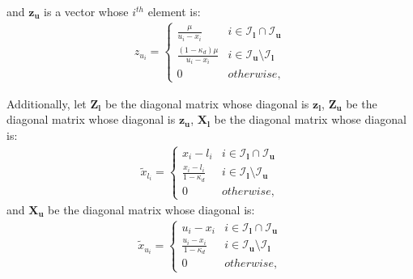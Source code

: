  and $\bm{z}_{\bm{u}}$ is a vector whose $i^{th}$ element is:
  \begin{align}
      z_{u_i} = \begin{cases}
        \frac{\mu}{u_i - x_i} & i \in \mathcal{I}_{\bm{l}} \cap \mathcal{I}_{\bm{u}} \\
        \frac{(1 - \kappa_d) \mu}{u_i - x_i} &  i \in \mathcal{I}_{\bm{u}} \setminus \mathcal{I}_{\bm{l}} \\
        0 & otherwise,
      \end{cases}
  \end{align}
  
  Additionally, let $\bm{Z}_{\bm{l}}$ be the diagonal matrix whose diagonal is $\bm{z}_{\bm{l}}$, $\bm{Z}_{\bm{u}}$ be the diagonal matrix whose diagonal is $\bm{z}_{\bm{u}}$, $\bm{X}_{\bm{l}}$ be the diagonal matrix whose diagonal is:
  \begin{align}
      \tilde{x}_{l_i} = \begin{cases}
        x_i - l_i & i \in \mathcal{I}_{\bm{l}} \cap \mathcal{I}_{\bm{u}} \\
        \frac{x_i - l_i}{1 - \kappa_d} &  i \in \mathcal{I}_{\bm{l}} \setminus \mathcal{I}_{\bm{u}} \\
        0 & otherwise,
      \end{cases}
  \end{align}
  and $\bm{X}_{\bm{u}}$ be the diagonal matrix whose diagonal is:
  \begin{align}
      \tilde{x}_{u_i} = \begin{cases}
        u_i - x_i & i \in \mathcal{I}_{\bm{l}} \cap \mathcal{I}_{\bm{u}} \\
        \frac{u_i - x_i}{1 - \kappa_d} &  i \in \mathcal{I}_{\bm{u}} \setminus \mathcal{I}_{\bm{l}} \\
        0 & otherwise,
      \end{cases}
  \end{align}
  
